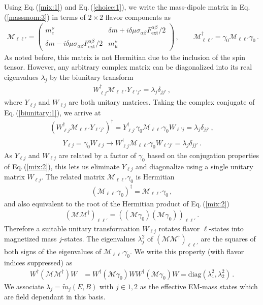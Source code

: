 \documentclass{ws-ijmpa}
\newcommand{\req}[1]{Eq.\,(\ref{#1})}
\begin{document}
Using \req{mix:1} and \req{choice:1}, we write the mass-dipole matrix in \req{massmom:3} in terms of $2\times2$ flavor components as
\begin{align}
\label{mix:2}
\mathcal{M}_{\ell\ell'} = 
\begin{pmatrix}
m_{e}^{\nu} & {\delta m}+i\delta\mu\sigma_{\alpha\beta}F^{\alpha\beta}_\mathrm{ext}/2\\
{\delta m}-i\delta\mu\sigma_{\alpha\beta}F^{\alpha\beta}_\mathrm{ext}/2 & m_{\mu}^{\nu}
\end{pmatrix}\,,\qquad
\mathcal{M}_{\ell\ell'}^{\dag}=\gamma_{0}\mathcal{M}_{\ell\ell'}\gamma_{0}\,.
\end{align}
As noted before, this matrix is not Hermitian due to the inclusion of the spin tensor. However, any arbitrary complex matrix can be diagonalized into its real eigenvalues $\lambda_{j}$ by the biunitary transform
\begin{align}
\label{biunitary:1}
W_{\ell j}^{\dag}\mathcal{M}_{\ell\ell'}Y_{\ell'j'}=\lambda_{j}\delta_{jj'}\,,
\end{align}
where $Y_{\ell j}$ and $W_{\ell j}$ are both unitary matrices. Taking the complex conjugate of \req{biunitary:1}, we arrive at
\begin{align}
\label{biunitary:2}
(W_{\ell j}^{\dag}\mathcal{M}_{\ell\ell'}Y_{\ell'j'})^{\dag} = 
Y_{\ell j'}^{\dag}\gamma_{0}\mathcal{M}_{\ell\ell'}\gamma_{0}W_{\ell' j}=\lambda_{j}\delta_{jj'}\,,
\end{align}
%
\begin{align}
Y_{\ell j}=\gamma_{0}W_{\ell j}\rightarrow
W_{\ell j}^{\dag}\mathcal{M}_{\ell\ell'}\gamma_{0}W_{\ell'j'}=\lambda_{j}\delta_{jj'}\,. 
\end{align}
As $Y_{\ell j}$ and $W_{\ell j}$ are related by a factor of $\gamma_{0}$ based on the conjugation properties of \req{mix:2}, this lets us eliminate $Y_{\ell j}$ and diagonalize using a single unitary matrix $W_{\ell j}$. The related matrix $\mathcal{M}_{\ell\ell'}\gamma_{0}$ is Hermitian
\begin{align}
\label{herm:1}
(\mathcal{M}_{\ell\ell'}\gamma_{0})^{\dag} = \mathcal{M}_{\ell\ell'}\gamma_{0}\,,
\end{align}
and also equivalent to the root of the Hermitian product of \req{mix:2}
\begin{align}
(\mathcal{M}\mathcal{M}^{\dag})_{\ell\ell'} = \left((\mathcal{M}\gamma_{0})(\mathcal{M}\gamma_{0})\right)_{\ell\ell'}\,.
\end{align}
Therefore a suitable unitary transformation $W_{\ell j}$ rotates flavor $\ell$-states into magnetized mass $j$-states. The eigenvalues $\lambda_{j}^{2}$ of $(\mathcal{M}\mathcal{M}^{\dag})_{\ell\ell'}$ are the squares of both signs of the eigenvalues of $\mathcal{M}_{\ell\ell'}\gamma_{0}$. We write this property (with flavor indices suppressed) as
\begin{align}
W^{\dag}(\mathcal{M}\mathcal{M}^{\dag})W &= W^{\dag}(\mathcal{M}\gamma_{0})WW^{\dag}(\mathcal{M}\gamma_{0})W = \mathrm{diag}(\lambda_{1}^{2},\lambda_{2}^{2})\,.
\end{align}
We associate $\lambda_{j}=\widetilde m_{j}(E,B)$ with $j\in1,2$ as the effective EM-mass states which are field dependant in this basis. 
\end{document}

